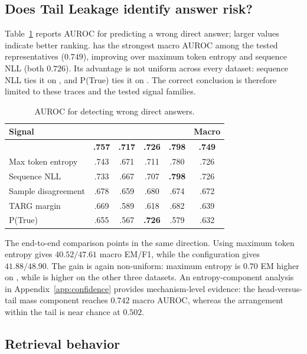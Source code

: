 \subsection{Does Tail Leakage identify answer risk?}
\label{sec:confidence-results}

Table~\ref{tab:confidence} reports AUROC for predicting a wrong direct answer;
larger values indicate better ranking. \tailleak{} has the strongest macro
AUROC among the tested representatives (\(0.749\)), improving over maximum
token entropy and sequence NLL (both \(0.726\)). Its advantage is not uniform
across every dataset: sequence NLL ties it on \popqa{}, and P(True) ties it on
\musique{}. The correct conclusion is therefore limited to these traces and
the tested signal families.

\begin{table}[t]
\caption{AUROC for detecting wrong direct answers.}
\label{tab:confidence}
\centering
\scriptsize
\setlength{\tabcolsep}{3.6pt}
\begin{tabular}{lccccc}
\toprule
Signal & \hotpot{} & \twowiki{} & \musique{} & \popqa{} & Macro \\
\midrule
\tailleak{} & \textbf{.757} & \textbf{.717} & \textbf{.726} & \textbf{.798} & \textbf{.749} \\
Max token entropy & .743 & .671 & .711 & .780 & .726 \\
Sequence NLL & .733 & .667 & .707 & \textbf{.798} & .726 \\
Sample disagreement & .678 & .659 & .680 & .674 & .672 \\
TARG margin & .669 & .589 & .618 & .682 & .639 \\
P(True) & .655 & .567 & \textbf{.726} & .579 & .632 \\
\bottomrule
\end{tabular}
\end{table}

The end-to-end comparison points in the same direction. Using maximum token
entropy gives \(40.52/47.61\) macro EM/F1, while the \tailleak{}
configuration gives \(41.88/48.90\). The gain is again non-uniform:
maximum entropy is \(0.70\) EM higher on \twowiki{}, while \tailleak{} is
higher on the other three datasets. An entropy-component analysis in
Appendix~\ref{app:confidence} provides mechanism-level evidence: the
head-versus-tail mass component reaches \(0.742\) macro AUROC, whereas the
arrangement within the tail is near chance at \(0.502\).

\subsection{Retrieval behavior}
\label{sec:retrieval-results}


